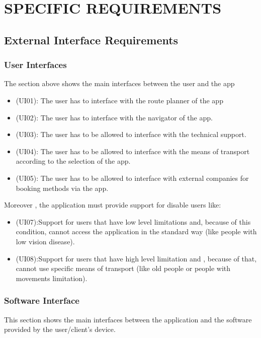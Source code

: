 \documentclass[a4paper,leqno]{book}
\begin{document}
\chapter{SPECIFIC REQUIREMENTS}

\section{External Interface Requirements}

\subsection{User Interfaces}
The section above shows the main interfaces between the user and the app 
\begin{itemize}
\item (UI01): The user has to interface with the route planner of the app
\item (UI02): The user has to interface with the navigator of the app.
\item (UI03): The user has to be allowed to interface with the technical support.
\item (UI04): The user has to be allowed to interface with the means of transport according to the selection of the app.
\item (UI05): The user has to be allowed to interface with external companies for booking methods via the app.
\end{itemize}

Moreover , the application must provide support for disable users like:
\begin{itemize}

\item (UI07):Support for users that have low level limitations and, because of this condition, cannot access the application in the standard way (like people with low vision disease). 
\item (UI08):Support for users that have high level limitation and , because of that, cannot use specific means of transport (like old people or people with movements limitation).

\end{itemize}

\subsection{Software Interface}
This section shows the main interfaces between the application and the software provided by the user/client's device.
\end{document}
